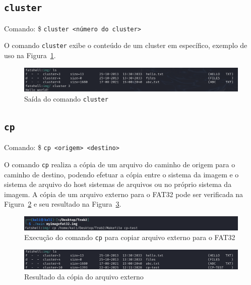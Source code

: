 \documentclass[
    12pt,				%
    oneside,   	        %
    a4paper,			%
    english,			%
    french,				%
    spanish,			%
    brazil,				%
    ]{pacotes/abntex2}
\begin{document}

\subsection{\texttt{cluster}}
\label{subsec:cluster}
Comando: \$ \texttt{cluster <número do cluster>}

O comando \texttt{cluster} exibe o conteúdo de um cluster em específico, exemplo de uso na Figura~\ref{fig:cluester}.

\begin{figure}[H]
    \centering
    \includegraphics[width=450pt]{figuras/resultados/2-cluster.PNG}
    \caption{Saída do comando \texttt{cluster}}
    \label{fig:cluester}
\end{figure}


\subsection{\texttt{cp}}
\label{subsec:cp}
Comando: \$ \texttt{cp <origem> <destino>}  

O comando \texttt{cp} realiza a cópia de um arquivo do caminho de origem para o caminho de destino, podendo efetuar a cópia entre o sistema da imagem e o sistema de arquivo do host sistemas de arquivos ou no próprio sistema da imagem. A cópia de um arquivo externo para o FAT32 pode ser verificada na Figura~\ref{fig:cp-externo-interno-1} e seu resultado na Figura~\ref{fig:cp-externo-interno-2}.

\begin{figure}[H]
    \centering
    \includegraphics[width=450pt]{figuras/resultados/3.1-cp-externo-interno.PNG}
    \caption{Execução do comando \texttt{cp} para copiar arquivo externo para o FAT32}
    \label{fig:cp-externo-interno-1}
\end{figure}

\begin{figure}[H]
    \centering
    \includegraphics[width=450pt]{figuras/resultados/3.2-cp-externo-interno.PNG}
    \caption{Resultado da cópia do arquivo externo}
    \label{fig:cp-externo-interno-2}
\end{figure}
\end{document}
